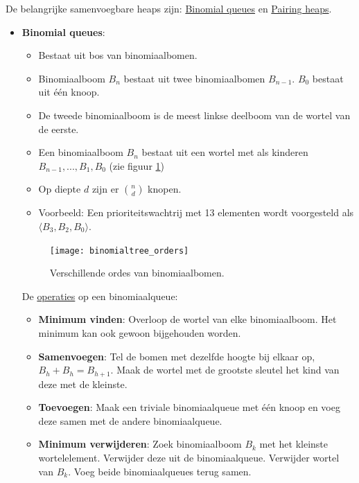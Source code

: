 \documentclass{report}
\begin{document}
De belangrijke samenvoegbare heaps zijn: \underline{Binomial queues} en \underline{Pairing heaps}.
\begin{itemize}
	\item \textbf{Binomial queues}:
		\begin{itemize}
			\item Bestaat uit bos van binomiaalbomen.
			\item Binomiaalboom $B_n$ bestaat uit twee binomiaalbomen $B_{n-1}$. $B_0$ bestaat uit één knoop.
			\item De tweede binomiaalboom is de meest linkse deelboom van de wortel van de eerste.
			\item Een binomiaalboom $B_n$ bestaat uit een wortel met als kinderen $B_{n-1}, ..., B_1, B_0$ (zie figuur \ref{fig:binomialtree_orders})
			\item Op diepte $d$ zijn er $\binom{n}{d}$ knopen.
			\item Voorbeeld: Een prioriteitswachtrij met 13 elementen wordt voorgesteld als $\langle B_3, B_2, B_0 \rangle$.
		\end{itemize}
		\begin{figure}[ht]
			\centering
			\texttt{[image: binomialtree\_orders]}
			\caption{Verschillende ordes van binomiaalbomen.}
			\label{fig:binomialtree_orders}
		\end{figure}

		De \underline{operaties} op een binomiaalqueue:
		\begin{itemize}
			\item \textbf{Minimum vinden}: Overloop de wortel van elke binomiaalboom. Het minimum kan ook gewoon bijgehouden worden.
			\item \textbf{Samenvoegen}: Tel de bomen met dezelfde hoogte bij elkaar op, $B_h + B_h = B_{h + 1}$. Maak de wortel met de grootste sleutel het kind van deze met de kleinste. 
			\item \textbf{Toevoegen}: Maak een triviale binomiaalqueue met één knoop en voeg deze samen met de andere binomiaalqueue.
			\item \textbf{Minimum verwijderen}: Zoek binomiaalboom $B_k$ met het kleinste wortelelement. Verwijder deze uit de binomiaalqueue. Verwijder wortel van  $B_k$. Voeg beide binomiaalqueues terug samen.
		\end{itemize}


\end{itemize}
\end{document}
